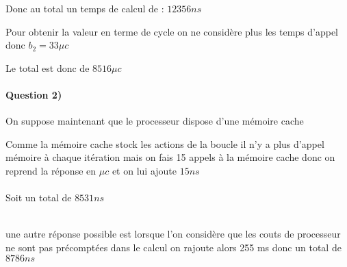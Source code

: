 \documentclass[12pt]{report}
\newcommand{\ns}{\\\indent\indent\vspace{0.25cm}}
\begin{document}
Donc au total un temps de calcul de : $\boxed{12356 ns}$
\vspace{1.5cm}

Pour obtenir la valeur en terme de cycle on ne considère plus les temps d'appel donc $b_2 = 33\mu c$

Le total est donc  de $\boxed{8516 \mu c}$ 

\paragraph*{Question 2)}

On suppose maintenant que le processeur dispose d'une mémoire cache 

Comme la mémoire cache stock les actions de la boucle il n'y a plus d'appel mémoire à chaque itération mais on fais 15 appels à la mémoire cache
donc  on reprend la réponse en $\mu c$ et on lui ajoute $15 ns$\\
\ns
Soit un total de $\boxed{8531 ns}$ \\
\ns 

une autre réponse possible est lorsque l'on considère que les couts de processeur ne sont pas précomptées dans le calcul on rajoute alors 255 ms 
donc un total de$\boxed{8786 ns}$
\end{document}
